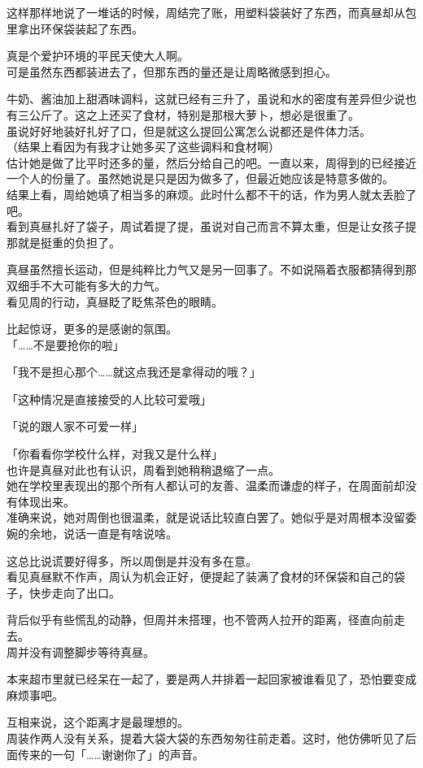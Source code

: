 这样那样地说了一堆话的时候，周结完了账，用塑料袋装好了东西，而真昼却从包里拿出环保袋装起了东西。

真是个爱护环境的平民天使大人啊。\\

可是虽然东西都装进去了，但那东西的量还是让周略微感到担心。

牛奶、酱油加上甜酒味调料，这就已经有三升了，虽说和水的密度有差异但少说也有三公斤了。这之上还买了食材，特别是那根大萝卜，想必是很重了。\\

虽说好好地装好扎好了口，但是就这么提回公寓怎么说都还是件体力活。\\

（结果上看因为有我才让她多买了这些调料和食材啊）\\

估计她是做了比平时还多的量，然后分给自己的吧。一直以来，周得到的已经接近一个人的份量了。虽然她说是只是因为做多了，但最近她应该是特意多做的。\\

结果上看，周给她填了相当多的麻烦。此时什么都不干的话，作为男人就太丢脸了吧。\\

看到真昼扎好了袋子，周试着提了提，虽说对自己而言不算太重，但是让女孩子提那就是挺重的负担了。

真昼虽然擅长运动，但是纯粹比力气又是另一回事了。不如说隔着衣服都猜得到那双细手不大可能有多大的力气。\\

看见周的行动，真昼眨了眨焦茶色的眼睛。

比起惊讶，更多的是感谢的氛围。\\

「……不是要抢你的啦」

「我不是担心那个……就这点我还是拿得动的哦？」

「这种情况是直接接受的人比较可爱哦」

「说的跟人家不可爱一样」

「你看看你学校什么样，对我又是什么样」\\

也许是真昼对此也有认识，周看到她稍稍退缩了一点。\\

她在学校里表现出的那个所有人都认可的友善、温柔而谦虚的样子，在周面前却没有体现出来。\\

准确来说，她对周倒也很温柔，就是说话比较直白罢了。她似乎是对周根本没留委婉的余地，说话一直是有啥说啥。

这总比说谎要好得多，所以周倒是并没有多在意。\\

看见真昼默不作声，周认为机会正好，便提起了装满了食材的环保袋和自己的袋子，快步走向了出口。

背后似乎有些慌乱的动静，但周并未搭理，也不管两人拉开的距离，径直向前走去。\\

周并没有调整脚步等待真昼。

本来超市里就已经呆在一起了，要是两人并排着一起回家被谁看见了，恐怕要变成麻烦事吧。

互相来说，这个距离才是最理想的。\\

周装作两人没有关系，提着大袋大袋的东西匆匆往前走着。这时，他仿佛听见了后面传来的一句「……谢谢你了」的声音。
